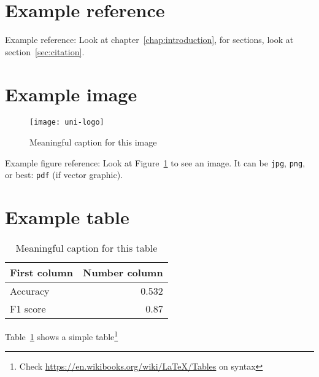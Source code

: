 \section{Example reference}
Example reference: Look at chapter~\ref{chap:introduction}, for sections, look at section~\ref{sec:citation}.

\section{Example image}

\begin{figure}
	\centering
	\texttt{[image: uni-logo]}
	\caption{Meaningful caption for this image}
	\label{fig:uniLogo}
\end{figure}

Example figure reference: Look at Figure~\ref{fig:uniLogo} to see an image. It can be \texttt{jpg}, \texttt{png}, or best: \texttt{pdf} (if vector graphic).

\section{Example table}

\begin{table}
	\centering
	\begin{tabular}{lr}
		First column & Number column \\
		\hline
		Accuracy & 0.532 \\
		F1 score & 0.87
	\end{tabular}
	\caption{Meaningful caption for this table}
	\label{tab:result}
\end{table}

Table~\ref{tab:result} shows a simple table\footnote{Check \url{https://en.wikibooks.org/wiki/LaTeX/Tables} on syntax}